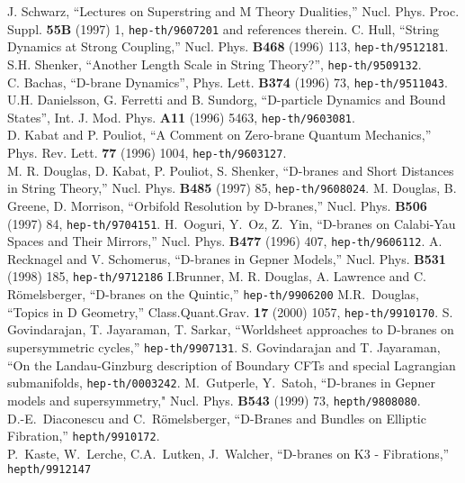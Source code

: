 \documentclass[a4paper,12pt]{article}
\begin{document}
\begin{thebibliography}{99}
 J. Schwarz, ``Lectures on Superstring and M Theory
Dualities,'' Nucl. Phys. Proc. Suppl. {\bf 55B} (1997) 1, 
{\tt hep-th/9607201} and references therein.
 C. Hull, ``String Dynamics at Strong Coupling,''
Nucl. Phys. {\bf B468} (1996) 113, {\tt hep-th/9512181}.
S.H. Shenker, ``Another Length Scale in String Theory?'',
{\tt hep-th/9509132}. \\
C. Bachas, ``D-brane Dynamics'', Phys. Lett. {\bf B374} (1996) 73,
{\tt hep-th/9511043}. \\
U.H. Danielsson, G. Ferretti and B. Sundorg, ``D-particle
Dynamics and Bound States'', Int. J. Mod. Phys. {\bf A11}
(1996) 5463, {\tt hep-th/9603081}. \\
D. Kabat and P. Pouliot, ``A Comment on Zero-brane Quantum Mechanics,''
Phys. Rev. Lett. {\bf 77} (1996) 1004, {\tt hep-th/9603127}. \\
M. R. Douglas, D. Kabat, P. Pouliot, S. Shenker,
``D-branes and Short Distances in String Theory,''
Nucl.  Phys. {\bf B485} (1997) 85,  {\tt hep-th/9608024}.
M. Douglas, B. Greene, D. Morrison, 
``Orbifold Resolution by D-branes,''
Nucl. Phys. {\bf B506} (1997) 84, {\tt hep-th/9704151}.
H.~Ooguri, Y.~Oz, Z.~Yin, 
``D-branes on Calabi-Yau Spaces and Their Mirrors,''
Nucl. Phys. {\bf B477} (1996) 407, {\tt hep-th/9606112}. 
A. Recknagel and V. Schomerus, ``D-branes in Gepner Models,'' 
Nucl. Phys. {\bf B531} (1998) 185, {\tt hep-th/9712186}
 I.Brunner, M. R. Douglas, A. Lawrence and C.
R\"omelsberger, ``D-branes on the Quintic,'' {\tt hep-th/9906200}
M.R.~Douglas, ``Topics in D Geometry,''
Class.Quant.Grav. {\bf 17} (2000) 1057, {\tt hep-th/9910170}.
S. Govindarajan, T. Jayaraman, T. Sarkar, ``Worldsheet approaches to D-branes 
on supersymmetric cycles,'' {\tt hep-th/9907131}.
 S. Govindarajan and T. Jayaraman, ``On the
Landau-Ginzburg description of Boundary CFTs and special Lagrangian 
submanifolds, {\tt hep-th/0003242}.
M.~Gutperle, Y.~Satoh, ``D-branes in Gepner models
and supersymmetry," Nucl. Phys. {\bf B543} (1999) 73, {\tt hepth/9808080}. \\
D.-E.~Diaconescu and C.~R\"omelsberger, 
``D-Branes and Bundles on Elliptic Fibration,'' {\tt hepth/9910172}. \\
P.~Kaste, W.~Lerche, C.A.~Lutken, J.~Walcher, ``D-branes on K3 - Fibrations,''
{\tt hepth/9912147} \\

\end{thebibliography}
\end{document}
